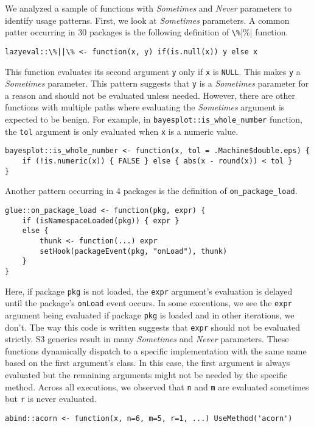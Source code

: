 \documentclass[review,nonacm,screen,acmsmall,anonymous=true]{acmart}
\newcommand{\sometimes}{\emph{Sometimes}\xspace}
\newcommand{\never}{\emph{Never}\xspace}
\newcommand{\code}[1]{\lstinline |#1|\xspace}
\begin{document}
We analyzed a sample of functions with \sometimes and \never parameters to
identify usage patterns.
%
First, we look at \sometimes parameters. A common patter occurring in 30
packages is the following definition of \code{\%||\%} function.
%
\begin{lstlisting}
lazyeval::\%||\% <- function(x, y) if(is.null(x)) y else x
\end{lstlisting}
%
This function evaluates its second argument \code{y} only if \code{x} is
\code{NULL}. This makes \code{y} a \sometimes parameter. This pattern suggests
that \code{y} is a \sometimes parameter for a reason and should not be evaluated
unless needed. However, there are other functions with multiple paths where
evaluating the \sometimes argument is expected to be benign. For example, in
\code{bayesplot::is_whole_number} function, the \code{tol} argument is only
evaluated when \code{x} is a numeric value.
%
\begin{lstlisting}
bayesplot::is_whole_number <- function(x, tol = .Machine$double.eps) {
    if (!is.numeric(x)) { FALSE } else { abs(x - round(x)) < tol }
}
\end{lstlisting}

Another pattern occurring in 4 packages is the definition of
\code{on_package_load}.

\begin{lstlisting}
glue::on_package_load <- function(pkg, expr) {
    if (isNamespaceLoaded(pkg)) { expr }
    else {
        thunk <- function(...) expr
        setHook(packageEvent(pkg, "onLoad"), thunk)
    }
}
\end{lstlisting}
%
Here, if package \code{pkg} is not loaded, the \code{expr} argument's evaluation
is delayed until the package's \code{onLoad} event occurs. In some executions,
we see the \code{expr} argument being evaluated if package \code{pkg} is loaded
and in other iterations, we don't. The way this code is written suggests that
\code{expr} should not be evaluated strictly.
%
S3 generics result in many \sometimes and \never parameters. These functions
dynamically dispatch to a specific implementation with the same name based on
the first argument's class. In this case, the first argument is always evaluated
but the remaining arguments might not be needed by the specific method. Across
all executions, we observed that \code{n} and \code{m} are evaluated sometimes
but \code{r} is never evaluated.
%
\begin{lstlisting}
abind::acorn <- function(x, n=6, m=5, r=1, ...) UseMethod('acorn')
\end{lstlisting}
\end{document}
